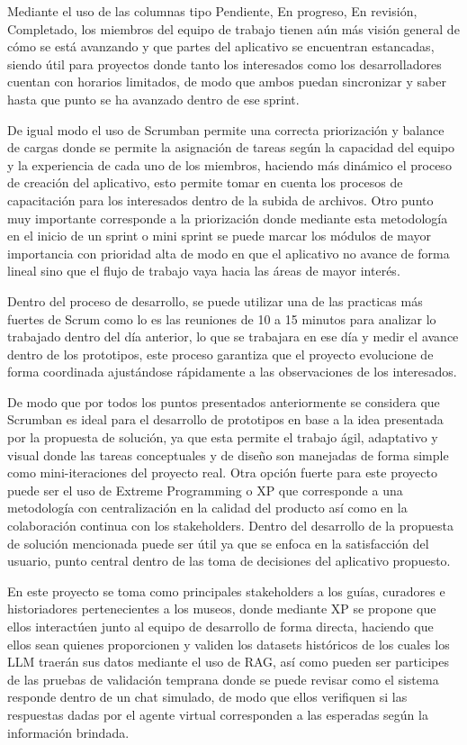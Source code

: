 \documentclass[pdflatex,sn-mathphys-num]{sn-jnl}%
\theoremstyle{thmstyleone}%
\theoremstyle{thmstyletwo}%
\theoremstyle{thmstylethree}%
\begin{document}
Mediante el uso de las columnas tipo Pendiente, En progreso, En revisión, Completado, los miembros del equipo de trabajo tienen aún más visión general de cómo se está avanzando y que partes del aplicativo se encuentran estancadas, siendo útil para proyectos donde tanto los interesados como los desarrolladores cuentan con horarios limitados, de modo que ambos puedan sincronizar y saber hasta que punto se ha avanzado dentro de ese sprint.

De igual modo el uso de Scrumban permite una correcta priorización y balance de cargas donde se permite la asignación de tareas según la capacidad del equipo y la experiencia de cada uno de los miembros, haciendo más dinámico el proceso de creación del aplicativo, esto permite tomar en cuenta los procesos de capacitación para los interesados dentro de la subida de archivos. Otro punto muy importante corresponde a la priorización donde mediante esta metodología en el inicio de un sprint o mini sprint se puede marcar los módulos de mayor importancia con prioridad alta de modo en que el aplicativo no avance de forma lineal sino que el flujo de trabajo vaya hacia las áreas de mayor interés.

Dentro del proceso de desarrollo, se puede utilizar una de las practicas más fuertes de Scrum como lo es las reuniones de 10 a 15 minutos para analizar lo trabajado dentro del día anterior, lo que se trabajara en ese día y medir el avance dentro de los prototipos, este proceso garantiza que el proyecto evolucione de forma coordinada ajustándose rápidamente a las observaciones de los interesados.

De modo que por todos los puntos presentados anteriormente se considera que Scrumban es ideal para el desarrollo de prototipos en base a la idea presentada por la propuesta de solución, ya que esta permite el trabajo ágil, adaptativo y visual donde las tareas conceptuales y de diseño son manejadas de forma simple como mini-iteraciones del proyecto real.
Otra opción fuerte para este proyecto puede ser el uso de Extreme Programming o XP que corresponde a una metodología con centralización en la calidad del producto así como en la colaboración continua con los stakeholders. Dentro del desarrollo de la propuesta de solución mencionada puede ser útil ya que se enfoca en la satisfacción del usuario, punto central dentro de las toma de decisiones del aplicativo propuesto.

En este proyecto se toma como principales stakeholders a los guías, curadores e historiadores pertenecientes a los museos, donde mediante XP se propone que ellos interactúen junto al equipo de desarrollo de forma directa, haciendo que ellos sean quienes proporcionen y validen los datasets históricos de los cuales los LLM traerán sus datos mediante el uso de RAG, así como pueden ser participes de las pruebas de validación temprana donde se puede revisar como el sistema responde dentro de un chat simulado, de modo que ellos verifiquen si las respuestas dadas por el agente virtual corresponden a las esperadas según la información brindada.
\end{document}
